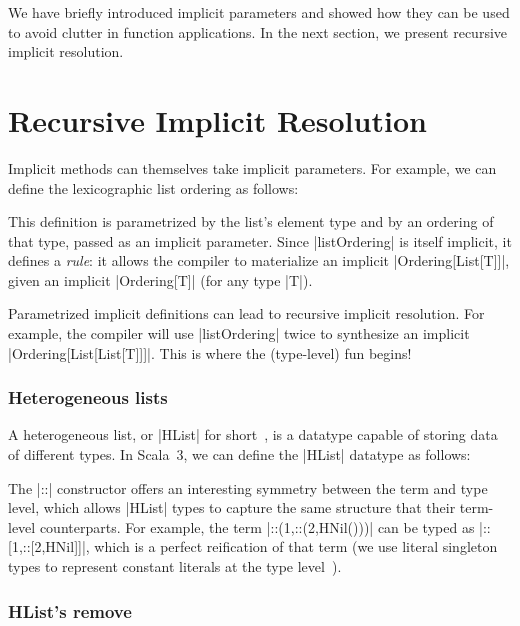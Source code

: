 \ordExample

We have briefly introduced implicit parameters and showed how they can be used to avoid clutter in function applications.
In the next section, we present recursive implicit resolution.

\section{Recursive Implicit Resolution}

Implicit methods can themselves take implicit parameters.
For example, we can define the lexicographic list ordering as follows:

\ordListExample

\noindent
This definition is parametrized by the list's element type and by an ordering of that type, passed as an implicit parameter.
Since |listOrdering| is itself implicit, it defines a \emph{rule}: it allows the compiler to materialize an implicit |Ordering[List[T]]|, given an implicit |Ordering[T]| (for any type |T|).

Parametrized implicit definitions can lead to recursive implicit resolution. For example, the compiler will use |listOrdering| twice to synthesize an implicit |Ordering[List[List[T]]]|.
This is where the (type-level) fun begins!

\subsubsection{Heterogeneous lists}

A heterogeneous list, or |HList| for short~\citep{kiselyov2004strongly}, is a datatype capable of storing data of different types.
In Scala~3, we can define the |HList| datatype as follows:

\hlistEnumDefinition

\noindent
The |::| constructor offers an interesting symmetry between the term and type level, which allows |HList| types to capture the same structure that their term-level counterparts.
For example, the term |::(1,::(2,HNil()))| can be typed as |::[1,::[2,HNil]]|, which is a perfect reification of that term (we use literal singleton types to represent constant literals at the type level~\citep{leontiev2014sip}).

\subsubsection{HList's remove}
\label{sec:hlists-remove}

